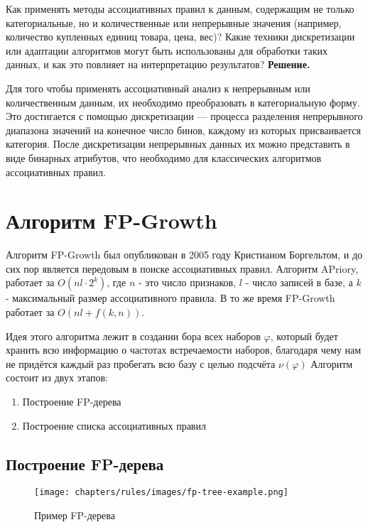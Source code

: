 Как применять методы ассоциативных правил к данным, содержащим не только категориальные, но и количественные или непрерывные значения (например, количество купленных единиц товара, цена, вес)? Какие техники дискретизации или адаптации алгоритмов могут быть использованы для обработки таких данных, и как это повлияет на интерпретацию результатов?
\newline
\textbf{Решение.}

Для того чтобы применять ассоциативный анализ к непрерывным или количественным данным, их необходимо преобразовать в категориальную форму. Это достигается с помощью дискретизации — процесса разделения непрерывного диапазона значений на конечное число бинов, каждому из которых присваивается категория. После дискретизации непрерывных данных их можно представить в виде бинарных атрибутов, что необходимо для классических алгоритмов ассоциативных правил.

\section{Алгоритм FP-Growth}
Алгоритм FP-Growth был опубликован в 2005 году Кристианом Боргельтом, и до сих пор является передовым в поиске ассоциативных правил. Алгоритм APriory, работает за $O(nl\cdot 2^k)$, где $n$ - это число признаков, $l$ - число записей в базе, а $k$ - максимальный размер ассоциативного правила. В то же время FP-Growth работает за $O(nl + f(k, n))$.

Идея этого алгоритма лежит в создании бора всех наборов $\varphi$, который будет хранить всю информацию о частотах встречаемости наборов, благодаря чему нам не придётся каждый раз пробегать всю базу с целью подсчёта $\nu(\varphi)$
\newline\newline
Алгоритм состоит из двух этапов:
\begin{enumerate}
    \item Построение FP-дерева
    \item Построение списка ассоциативных правил
\end{enumerate}

\subsection{Построение FP-дерева}

\begin{figure}[h]
    \centering
    \texttt{[image: chapters/rules/images/fp-tree-example.png]}
    \caption{Пример FP-дерева}
\end{figure}

